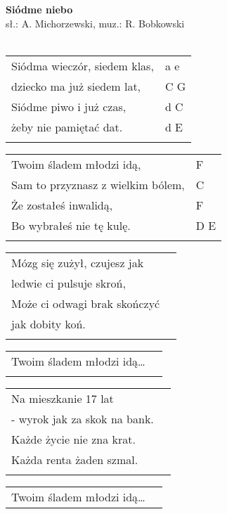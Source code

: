 \documentclass[a5paper]{article}
\begin{document}


\noindent
\fontsize{12pt}{15pt}\selectfont
\textbf{Siódme niebo} \\
\fontsize{8pt}{10pt}\selectfont
sł.: A. Michorzewski, muz.: R. Bobkowski \\ \\
\fontsize{10pt}{12pt}\selectfont
{}
\begin{tabular}{@{}p{8.00cm}p{3cm}@{}}
\noindent
Siódma wieczór, siedem klas, & a e \\ 
dziecko ma już siedem lat, & C G\\
Siódme piwo i już czas, & d C \\
żeby nie pamiętać dat. & d E \\ \\
\end{tabular}

\noindent
\begin{tabular}{@{}p{7.00cm}p{3cm}@{}}
Twoim śladem młodzi idą, & F \\
Sam to przyznasz z wielkim bólem, & C \\
Że zostałeś inwalidą, & F \\
Bo wybrałeś nie tę kulę. & D E \\ \\
\end{tabular}

\noindent
\begin{tabular}{@{}p{7.00cm}p{3cm}@{}}
Mózg się zużył, czujesz jak \\
ledwie ci pulsuje skroń, \\
Może ci odwagi brak skończyć \\ 
jak dobity koń.\\ \\
\end{tabular}

\noindent
\begin{tabular}{@{}p{7.00cm}p{3cm}@{}}
Twoim śladem młodzi idą… \\ \\
\end{tabular}

\noindent
\begin{tabular}{@{}p{7.00cm}p{3cm}@{}}
Na mieszkanie 17 lat \\
- wyrok jak za skok na bank.\\
Każde życie nie zna krat. \\ 
Każda renta żaden szmal.\\ \\
\end{tabular}

\noindent
\begin{tabular}{@{}p{7.00cm}p{3cm}@{}}
Twoim śladem młodzi idą…
\end{tabular}
\end{document}
